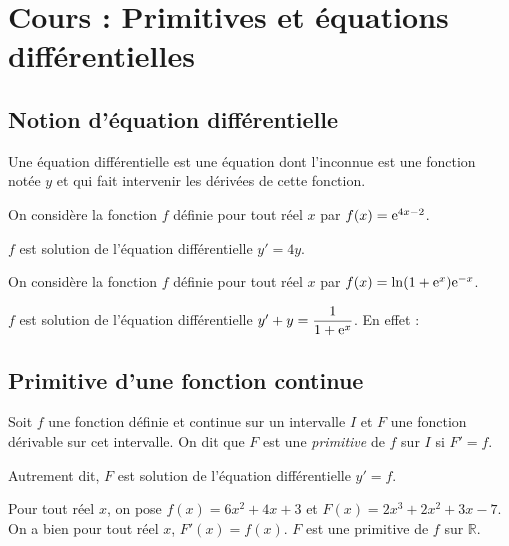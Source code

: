 \documentclass[11pt,fleqn, openany]{book} %
\begin{document}


\chapter{Cours : Primitives et équations différentielles}


\section{Notion d'équation différentielle}

\begin{definition}Une équation différentielle est une équation dont l'inconnue est une fonction notée $y$ et qui fait intervenir les dérivées de cette fonction.\end{definition}

\begin{example}On considère la fonction $f$ définie pour tout réel $x$ par $f(x)=\mathrm{e}^{4x-2}$. 

$f$ est solution de l'équation différentielle $y'=4y$. 

\vskip30pt
\end{example}

\begin{example}On considère la fonction $f$ définie pour tout réel $x$ par $f(x)=\ln(1+\mathrm{e}^x)\mathrm{e}^{-x}$. 

$f$ est solution de l'équation différentielle $y'+y=\dfrac{1}{1+\mathrm{e}^x}$. En effet :

\vskip200pt
\end{example}


\section{Primitive d'une fonction continue}



\begin{definition}Soit $f$ une fonction définie et continue sur un intervalle $I$ et $F$ une fonction dérivable sur cet intervalle. On dit que $F$ est une \textit{primitive} de $f$ sur $I$ si $F'=f$. 

Autrement dit, $F$ est solution de l'équation différentielle $y'=f$.\end{definition}


\begin{example} Pour tout réel $x$, on pose $f(x)=6x^2+4x+3$ et $F(x)=2x^3+2x^2+3x-7$. On a bien pour tout réel $x$, $F'(x)=f(x)$. $F$ est une primitive de $f$ sur $\mathbb{R}$.\end{example}
\end{document}
